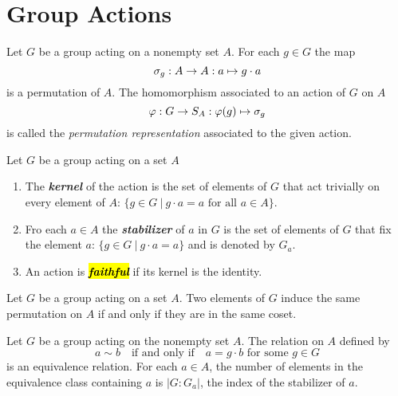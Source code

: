 
\section{Group Actions}

\setcounter{thm}{0}

\begin{defn}
Let $G$ be a group acting on a nonempty set $A$. For each $g\in G$ the map 
\[\sigma_g:A\rightarrow A:a\mapsto g\cdot a\]
is a permutation of $A$. The homomorphism associated to an action of $G$ on $A$
\[\varphi: G\rightarrow S_A:\varphi(g)\mapsto\sigma_g\]
is called the \textit{permutation representation} associated to the given action.
\end{defn}

\nl

\begin{defn}
Let $G$ be a group acting on a set $A$
\begin{enumerate}
\item The \textbf{\textit{kernel}} of the action is the set of elements of $G$ that act trivially on every element of $A$: $\{g\in G\ |\ g\cdot a = a\text{ for all }a\in A\}$.
\item Fro each $a\in A$ the \textbf{\textit{stabilizer}} of $a$ in $G$ is the set of elements of $G$ that fix the element $a$: $\{g\in G\ |\ g\cdot a =a\}$ and is denoted by $G_a$.
\item An action is \hl{\textbf{\textit{faithful}}} if its kernel is the identity.
\end{enumerate}
\end{defn}

\nl

\begin{cor}
Let $G$ be a group acting on a set $A$. Two elements of $G$ induce the same permutation on $A$ if and only if they are in the same coset.
\end{cor}

\nl

\begin{prop}
Let $G$ be a group acting on the nonempty set $A$. The relation on $A$ defined by
\[a\sim b\quad\text{if and only if}\quad a = g\cdot b\text{ for some } g\in G\]
is an equivalence relation. For each $a\in A$, the number of elements in the equivalence class containing $a$ is $|G:G_a|$, the index of the stabilizer of $a$.
\end{prop}

